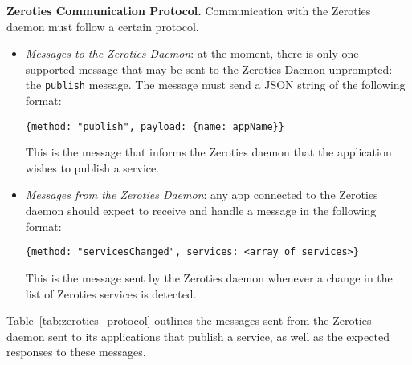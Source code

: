 


\textbf{Zeroties Communication Protocol.} Communication with the Zeroties daemon must follow a certain protocol.

\begin{itemize}
\item \textit{Messages to the Zeroties Daemon}: at the moment, there is only one supported message that may be sent to the Zeroties Daemon unprompted: the \texttt{publish} message.
The message must send a JSON string of the following format: 
\begin{lstlisting}[breaklines]
{method: "publish", payload: {name: appName}}
\end{lstlisting}
This is the message that informs the Zeroties daemon that the application wishes to publish a service.
\item \textit{Messages from the Zeroties Daemon}: any app connected to the Zeroties daemon should expect to receive and handle a message in the following format:
\begin{lstlisting}[breaklines]
{method: "servicesChanged", services: <array of services>}
\end{lstlisting}
This is the message sent by the Zeroties daemon whenever a change in the list of Zeroties services is detected.
\end{itemize}

Table~\ref{tab:zeroties_protocol} outlines the messages sent from the Zeroties daemon sent to its applications that publish a service, as well as the expected responses to these messages.

